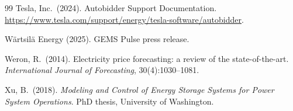 \documentclass[11pt]{article}
\begin{document}
\begin{thebibliography}{99}
Tesla, Inc.\ (2024). Autobidder Support Documentation. \url{https://www.tesla.com/support/energy/tesla-software/autobidder}.

W\"{a}rtsil\"{a} Energy (2025). GEMS Pulse press release.

Weron, R.\ (2014). Electricity price forecasting: a review of the state-of-the-art. \emph{International Journal of Forecasting}, 30(4):1030--1081.

Xu, B.\ (2018). \emph{Modeling and Control of Energy Storage Systems for Power System Operations}. PhD thesis, University of Washington.

\end{thebibliography}
\end{document}
